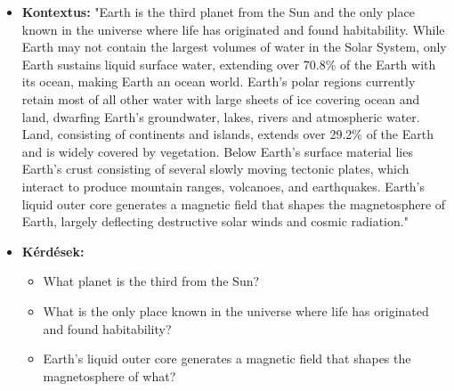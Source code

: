 \begin{itemize}
\item \textbf{Kontextus:} "Earth is the third planet from the Sun and the only place known in the universe where life has originated and found habitability. While Earth may not contain the largest volumes of water in the Solar System, only Earth sustains liquid surface water, extending over 70.8\% of the Earth with its ocean, making Earth an ocean world. Earth's polar regions currently retain most of all other water with large sheets of ice covering ocean and land, dwarfing Earth's groundwater, lakes, rivers and atmospheric water. Land, consisting of continents and islands, extends over 29.2\% of the Earth and is widely covered by vegetation. Below Earth's surface material lies Earth's crust consisting of several slowly moving tectonic plates, which interact to produce mountain ranges, volcanoes, and earthquakes. Earth's liquid outer core generates a magnetic field that shapes the magnetosphere of Earth, largely deflecting destructive solar winds and cosmic radiation."
\item \textbf{Kérdések:} 
	\begin{itemize}
		\item What planet is the third from the Sun?
		\item What is the only place known in the universe where life has originated and found habitability?
		\item Earth's liquid outer core generates a magnetic field that shapes the magnetosphere of what?
	\end{itemize}
\end{itemize}